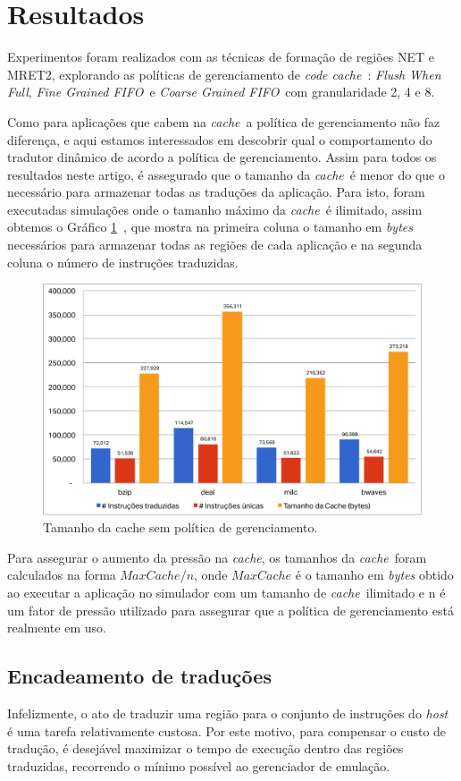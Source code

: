 \documentclass[12pt,twoside]{article}
\newcommand{\ccache}{\emph{code cache}}
\newcommand{\cache}{\emph{cache}}
\newcommand{\flush}{\emph{Flush When Full}}
\newcommand{\finefifo}{\emph{Fine Grained FIFO}}
\newcommand{\coarsefifo}{\emph{Coarse Grained FIFO}}
\begin{document}
\section{Resultados}
Experimentos foram realizados com as técnicas de formação de regiões NET e MRET2, explorando as políticas de gerenciamento de \ccache~: \flush, \finefifo~e \coarsefifo~com granularidade 2, 4 e 8. 

Como para aplicações que cabem na \cache~a política de gerenciamento não faz diferença, e aqui estamos interessados em descobrir qual o comportamento do tradutor dinâmico de acordo a política de gerenciamento. Assim para todos os resultados neste artigo, é assegurado que o tamanho da \cache~é menor do que o necessário para armazenar todas as traduções da aplicação. Para isto, foram executadas simulações onde o tamanho máximo da \cache~é ilimitado, assim obtemos o Gráfico \ref{fig-cache-sizes}~, que mostra na primeira coluna o tamanho em \emph{bytes} necessários para armazenar todas as regiões de cada aplicação e na segunda coluna o número de instruções traduzidas.

\begin{figure}[!ht]
\centering
\includegraphics[scale=0.5]{./figs/cache-sizes}
\caption{Tamanho da cache sem política de gerenciamento.}
\label{fig-cache-sizes}
\end{figure}

Para assegurar o aumento da pressão na \cache, os tamanhos da \cache~foram calculados na forma $MaxCache/n$, onde $MaxCache$ é o tamanho em \emph{bytes} obtido ao executar a aplicação no simulador com um tamanho de \cache~ilimitado e n é um fator de pressão utilizado para assegurar que a política de gerenciamento está realmente em uso.


\subsection{Encadeamento de traduções}
Infelizmente, o ato de traduzir uma região para o conjunto de instruções do \emph{host} é uma tarefa relativamente custosa. Por este motivo, para compensar o custo de tradução, é desejável maximizar o tempo de execução dentro das regiões traduzidas, recorrendo o mínimo possível ao gerenciador de emulação.
\end{document}
